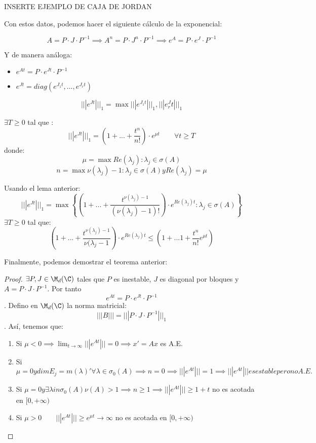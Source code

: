INSERTE EJEMPLO DE CAJA DE JORDAN

Con estos datos, podemos hacer el siguiente cálculo de la exponencial:

$$A=P\cdot J \cdot P^{-1} \implies A^n=P \cdot J^n \cdot P^{-1} \implies e^A=P \cdot e^J \cdot P^{-1}$$

Y de manera análoga:
\begin{itemize}
\item $e^{At}=P \cdot e^{Jt} \cdot P^{-1}$
\item $e^{Jt}=diag(e^{J_1t},...,e^{J_rt} )$
\end{itemize}


\begin{lema}
$$|||e^{Jt}|||_1=\max{|||e^{J_1t}|||_1,|||e^J_rt|||_1}$$
\end{lema}

\begin{lema}
$\exists T \geq 0 $ tal que :
$$|||e^{Jt}|||_1=\left(1+...+\frac{t^n}{n!}\right)\cdot e^{\mu t} \qquad \forall t \geq T$$
donde:
$$\mu=\max{Re(\lambda_j):\lambda_j\in \sigma(A)}$$
$$n=\max{\nu(\lambda_j)-1 : \lambda_j\in \sigma(A) y Re(\lambda_j)=\mu}$$
\end{lema}

Usando el lema anterior:
\begin{equation}
|||e^{Jt}|||_1=\max
\left\{ {\left(
1+...+\frac{t^{\nu(\lambda_j)-1}}{(\nu (\lambda_j)-1)!}
\right) }
\cdot e^{Re(\lambda_j)t} : \lambda_j \in \sigma(A) \right\}
\tag{cosarara}\label{cosarara}
\end{equation}
$\exists T \geq 0$ tal que:
\begin{equation}
(1+...+\frac{t^{\nu(\lambda_j)-1}}{\nu(\lambda_j - 1})\cdot e^{Re(\lambda_j)t} \leq (1+...1+\frac{t^n}{n!}e^{\mu t})
\end{equation}

Finalmente, podemos demostrar el teorema anterior:

\begin{proof}
$\exists P, J \in \M_d(\C)$ tales que $P$ es inestable, $J$ es diagonal por bloques y $A=P\cdot J \cdot P^{-1}$. Por tanto $$e^{At}=P\cdot e^{Jt} \cdot P^{-1}$$.
Defino en $\M_d(\C)$ la norma matricial:
$$|||B|||=|||P\cdot J \cdot P^{-1}|||_1$$.
Así, tenemos que:
\begin{enumerate}
\item Si $\mu < 0 \implies \lim_{t\to\infty}|||e^{At}|||=0\implies x'=Ax$ es A.E.
\item Si $\mu = 0 y dimE_j=m(\lambda)' \forall \lambda \in \sigma_0(A)\implies n=0 \implies |||e^{At}|||=1\implies|||e^{At}||| es estable pero no A.E.$
\item Si $\mu = 0 y \exists \lambda in \sigma_0(A) \nu(A)>1 \implies n\geq 1\implies |||e^{At}|||\geq 1+t$ no es acotada en $[0,+\infty)$
\item Si $\mu > 0 \qquad |||e^{At}|||\geq e^{\mu t}\to \infty$ no es acotada en $[0,+\infty)$
\end{enumerate}
\end{proof}


